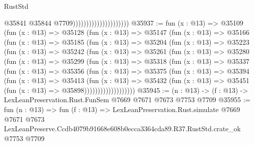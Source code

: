 \begin{lexlean}{RustStd}
\begin{coremodule}
                                              @35841
                                              @35844
                                              @7709)))))))))))))))))))))
@35937 := fun (x : @13) =>
  @35109
    (fun (x : @13) =>
    @35128
      (fun (x : @13) =>
      @35147
        (fun (x : @13) =>
        @35166
          (fun (x : @13) =>
          @35185
            (fun (x : @13) =>
            @35204
              (fun (x : @13) =>
              @35223
                (fun (x : @13) =>
                @35242
                  (fun (x : @13) =>
                  @35261
                    (fun (x : @13) =>
                    @35280
                      (fun (x : @13) =>
                      @35299
                        (fun (x : @13) =>
                        @35318
                          (fun (x : @13) =>
                          @35337
                            (fun (x : @13) =>
                            @35356
                              (fun (x : @13) =>
                              @35375
                                (fun (x : @13) =>
                                @35394
                                  (fun (x : @13) =>
                                  @35413
                                    (fun (x : @13) =>
                                    @35432
                                      (fun (x : @13) =>
                                      @35451 (fun (x : @13) => @35898)))))))))))))))))))
@35945 := (n : @13) -> (f : @13) -> LexLeanPreservation.Rust.FunSem @7669 @7671 @7673 @7753 @7709
@35955 := fun (n : @13) =>
  fun (f : @13) =>
  LexLeanPreservation.Rust.simulate
    @7669
    @7671
    @7673
    LexLeanPreserve.Ccdb4079b91668e608b0ecca3364cda89.R37.RustStd.crate_ok
    @7753
    @7709
\end{coremodule}
\end{lexlean}
